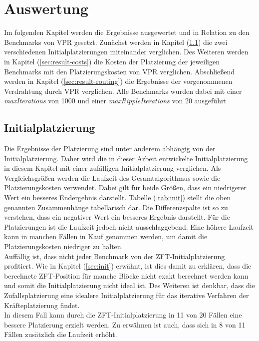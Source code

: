 \chapter{Auswertung}

    Im folgenden Kapitel werden die Ergebnisse ausgewertet und in Relation zu den Benchmarks von VPR gesetzt.
    Zunächst werden in Kapitel (\ref{sec:result-init}) die zwei verschiedenen Initialplatzierungen miteinander
    verglichen. Des Weiteren werden in Kapitel (\ref{sec:result-costs}) die Kosten der Platzierung
    der jeweiligen Benchmarks mit den Platzierungskosten von VPR verglichen.
    Abschließend werden in Kapitel (\ref{sec:result-routing}) die Ergebnisse der vorgenommenen
    Verdrahtung durch VPR verglichen.
    Alle Benchmarks wurden dabei mit einer \textit{maxIterations} von 1000
    und einer \textit{maxRippleIterations} von 20 ausgeführt

    \section{Initialplatzierung}\label{sec:result-init}

        Die Ergebnisse der Platzierung sind unter anderem abhängig von der Initialplatzierung.
        Daher wird die in dieser Arbeit entwickelte Initialplatzierung in diesem Kapitel mit einer
        zufälligen Initialplatzierung verglichen.
        Als Vergleichsgrößen werden die Laufzeit des Gesamtalgorithmus sowie die
        Platzierungskosten verwendet. Dabei gilt für beide Größen,
        dass ein niedrigerer Wert ein besseres Endergebnis darstellt. Tabelle (\ref{tab:init})
        stellt die oben genannten Zusammenhänge tabellarisch dar. Die Differenzspalte ist so zu verstehen,
        dass ein negativer Wert ein besseres Ergebnis darstellt.
        Für die Platzierungen ist die Laufzeit jedoch nicht ausschlaggebend.
        Eine höhere Laufzeit kann in manchen Fällen in Kauf genommen werden, um damit die
        Platzierungskosten niedriger zu halten.
        \\
        Auffällig ist, dass nicht jeder Benchmark von der
        ZFT-Initialplatzierung profitiert. Wie in Kapitel (\ref{sec:init}) erwähnt, ist dies damit zu erklären,
        dass die berechnete ZFT-Position für manche Blöcke nicht exakt berechnet werden kann und somit
        die Initialplatzierung nicht ideal ist. Des Weiteren ist denkbar,
        dass die Zufallsplatzierung eine idealere Initialplatzierung für das iterative
        Verfahren der Kräfteplatzierung findet.
        \\
        In diesem Fall kann durch die ZFT-Initialplatzierung in 11 von 20 Fällen eine bessere
        Platzierung erzielt werden. Zu erwähnen ist auch, dass sich in 8 von 11 Fällen zusätzlich die
        Laufzeit erhöht.

